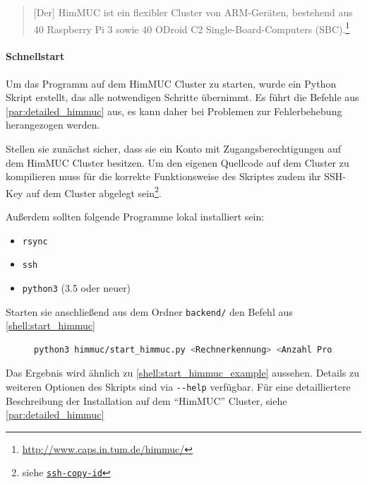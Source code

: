 \begin{quotation}
	[Der] HimMUC ist ein flexibler Cluster von ARM-Geräten, bestehend aus 40 Raspberry Pi 3 sowie 40 ODroid C2 Single-Board-Computers (SBC).\footnote{\url{http://www.caps.in.tum.de/himmuc/}}
\end{quotation}

\paragraph{Schnellstart}

Um das Programm auf dem HimMUC Cluster zu starten, wurde ein
Python Skript erstellt, das alle notwendigen Schritte übernimmt.
Es führt die Befehle aus \autoref{par:detailed_himmuc} aus, es kann daher bei Problemen zur Fehlerbehebung herangezogen werden.

Stellen sie zunächst sicher, dass sie ein Konto mit Zugangsberechtigungen auf dem HimMUC Cluster besitzen.
Um den eigenen Quellcode auf dem Cluster zu kompilieren muss für die korrekte Funktionsweise des Skriptes zudem
ihr SSH-Key auf dem Cluster abgelegt sein\footnote{siehe \href{https://www.ssh.com/ssh/copy-id}{\texttt{ssh-copy-id}}}.

Außerdem sollten folgende Programme lokal installiert sein:
\begin{itemize}
	\item \verb|rsync|
	\item \verb|ssh|
	\item \verb|python3| (3.5 oder neuer)
\end{itemize}

Starten sie anschließend aus dem Ordner \verb|backend/| den Befehl aus \autoref{shell:start_himmuc}

\begin{figure}[h!]
	\begin{lstlisting}[language=bash, caption={Start der Entwicklungsumbegung auf dem HimMUC}, label={shell:start_himmuc}]
python3 himmuc/start_himmuc.py <Rechnerkennung> <Anzahl Prozesse> <Anzahl Rechenknoten> 
    \end{lstlisting}
\end{figure}

Das Ergebnis wird ähnlich zu \autoref{shell:start_himmuc_example} aussehen.
Details zu weiteren Optionen des Skripts sind via \verb|--help| verfügbar.
Für eine detailliertere Beschreibung der Installation auf dem \enquote{HimMUC} Cluster,
siehe \autoref{par:detailed_himmuc}

